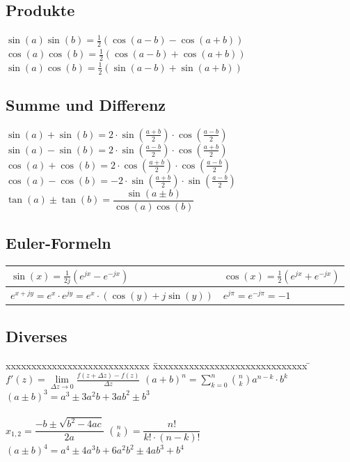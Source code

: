 	\subsection{Produkte}
		$\sin(a)\sin(b)=\frac{1}{2}(\cos(a-b)-\cos(a+b))$\\
		$\cos(a)\cos(b)=\frac{1}{2}(\cos(a-b)+\cos(a+b))$\\
		$\sin(a)\cos(b)=\frac{1}{2}(\sin(a-b)+\sin(a+b))$
		
	\subsection{Summe und Differenz}
		$\sin(a)+\sin(b)=2 \cdot \sin \left(\frac{a+b}{2}\right) \cdot
		\cos\left(\frac{a-b}{2}\right)$\\
		$\sin(a)-\sin(b)=2 \cdot \sin \left(\frac{a-b}{2}\right) \cdot
		\cos\left(\frac{a+b}{2}\right)$\\
		$\cos(a)+\cos(b)=2 \cdot \cos \left(\frac{a+b}{2}\right) \cdot
		\cos\left(\frac{a-b}{2}\right)$\\
		$\cos(a)-\cos(b)=-2 \cdot \sin \left(\frac{a+b}{2}\right) \cdot
		\sin\left(\frac{a-b}{2}\right)$\\
		$\tan(a) \pm \tan(b)=\dfrac{\sin(a \pm b)}{\cos(a)\cos(b)}$	

		
\subsection{Euler-Formeln}
 
	\begin{tabular}{|l|l|}
		\hline
		$\sin(x) = \frac{1}{2j}(e^{jx}-e^{-jx})$ & $\cos(x) = \frac{1}{2}(e^{jx}+e^{-jx})$ \\
		\hline
		$e^{x+jy} = e^{x} \cdot e^{jy} = e^{x} \cdot (\cos(y) + j\sin(y)) $ & $ e^{j\pi} = e^{-j\pi} = -1 $ \\
		\hline
	\end{tabular}

			 

\subsection{Diverses}
\begin{tabbing}
	xxxxxxxxxxxxxxxxxxxxxxxxxxxx \= xxxxxxxxxxxxxxxxxxxxxxxxxxxxxx \= \kill
 	$f'(z) = \lim \limits_{\Delta z \rightarrow 0} \frac{f(z + \Delta z) -
	f(z)}{\Delta z}$ \> $(a + b)^n = \sum_{k=0}^{n} \binom n k a^{n-k} \cdot b^k$ \>
	$(a \pm b)^3 =a^3 \pm  3 a^{2} b + 3 a b^2 \pm b^3 $\\ \\
	$x_{1,2} = \dfrac{-b \pm \sqrt{b^2 - 4ac}}{2a}$ \> $\binom n k = \dfrac{n!}{k!
	\cdot (n-k)!}$ \> $(a \pm b)^4 =a^4 \pm  4 a^{3} b + 6a^2b^2 \pm 4 a b^3 +
	b^4$\\
\end{tabbing}